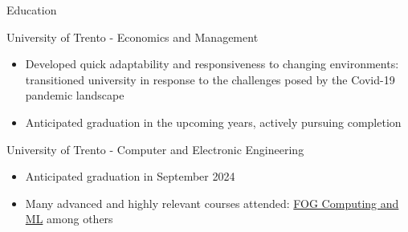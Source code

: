 \documentclass{article}
\newlength{\tabin}
\newlength{\secsep}
\newcommand{\lineunder}{\vspace*{-8pt} \\ \hspace*{-6pt} \hrulefill \\ \vspace*{-15pt}}
\newenvironment{tabbedsection}[1]{
  \begin{list}{}{
      \setlength{\itemsep}{0pt}
      \setlength{\labelsep}{0pt}
      \setlength{\labelwidth}{0pt}
      \setlength{\leftmargin}{\tabin}
      \setlength{\rightmargin}{\tabin}
      \setlength{\listparindent}{0pt}
      \setlength{\parsep}{0pt}
      \setlength{\parskip}{0pt}
      \setlength{\partopsep}{0pt}
      \setlength{\topsep}{#1}
    }
  \item[]
}{\end{list}}
\newenvironment{resume_section}[1]{
  \filbreak
  \vspace{2\secsep}
  \textsc{\large#1}
  \lineunder
  \begin{tabbedsection}{\secsep}
}{\end{tabbedsection}}
\newenvironment{resume_subsection}[2][]{
  \textbf{#2} \hfill {\footnotesize #1} \hspace{2em}
  \begin{tabbedsection}{0.5\secsep}
}{\end{tabbedsection}}
\newenvironment{subitems}{
  \renewcommand{\labelitemi}{$\bullet$} %
  \begin{itemize}
      \setlength{\labelsep}{1em}
}{\end{itemize}}
\begin{document}
\begin{resume_section}{Education}

  \begin{resume_subsection}[Trento, IT (2019 - 2021)]{University of Trento - Economics and Management}
    \begin{subitems}
      \item Developed quick adaptability and responsiveness to changing environments: transitioned university in response to the challenges posed by the Covid-19 pandemic landscape
      \item Anticipated graduation in the upcoming years, actively pursuing completion
    \end{subitems}
  \end{resume_subsection}

  \begin{resume_subsection}{University of Trento - Computer and Electronic Engineering}
    \begin{subitems}
      \item Anticipated graduation in September 2024
      \item Many advanced and highly relevant courses attended: \underline{FOG Computing and ML} among others
    \end{subitems}
  \end{resume_subsection}

\end{resume_section}
\end{document}
